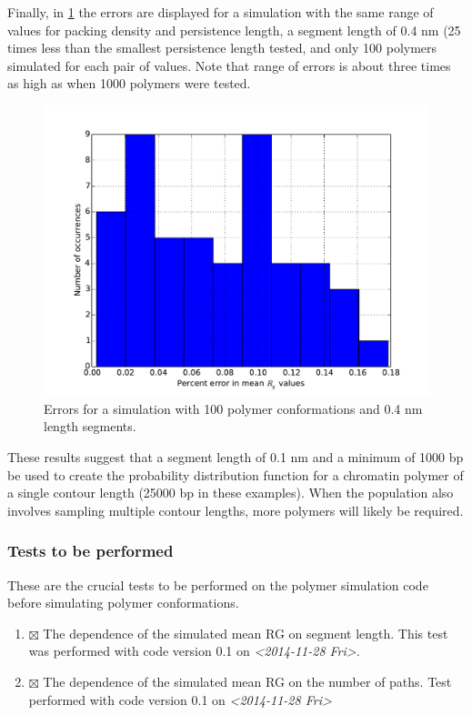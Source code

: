 \documentclass[11pt]{article}
\begin{document}
Finally, in \ref{fig-accuracy3} the errors are displayed for a
simulation with the same range of values for packing density and
persistence length, a segment length of 0.4 nm (25 times less than the
smallest persistence length tested, and only 100 polymers simulated
for each pair of values. Note that range of errors is about three
times as high as when 1000 polymers were tested.

\begin{figure}[htb]
\centering
\includegraphics[width=.9\linewidth]{./images/accuracy3.pdf}
\caption{\label{fig-accuracy3}Errors for a simulation with 100 polymer conformations and 0.4 nm length segments.}
\end{figure}

These results suggest that a segment length of 0.1 nm and a minimum of
1000 bp be used to create the probability distribution function for a
chromatin polymer of a single contour length (25000 bp in these
examples). When the population also involves sampling multiple contour
lengths, more polymers will likely be required.

\subsubsection{Tests to be performed}
\label{sec-3-3-2}
These are the crucial tests to be performed on the polymer simulation
code before simulating polymer conformations.

\begin{enumerate}
\item $\boxtimes$ The dependence of the simulated mean RG on segment length.
This test was performed with code version 0.1 on \textit{<2014-11-28 Fri>}.
\item $\boxtimes$ The dependence of the simulated mean RG on the number of
paths. Test performed with code version 0.1 on \textit{<2014-11-28 Fri>}
\end{enumerate}

\printbibliography
\end{document}
